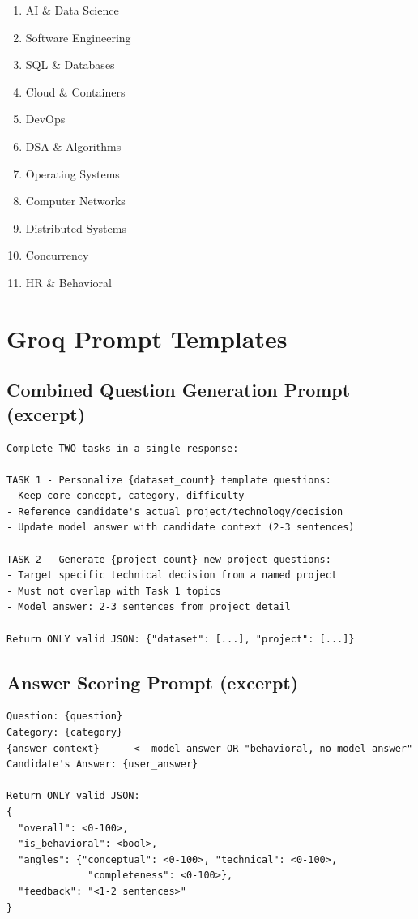 \documentclass[12pt,a4paper]{article}
\begin{document}
\begin{enumerate}[leftmargin=2em]
  \item AI \& Data Science
  \item Software Engineering
  \item SQL \& Databases
  \item Cloud \& Containers
  \item DevOps
  \item DSA \& Algorithms
  \item Operating Systems
  \item Computer Networks
  \item Distributed Systems
  \item Concurrency
  \item HR \& Behavioral
\end{enumerate}

\section{Groq Prompt Templates}

\subsection{Combined Question Generation Prompt (excerpt)}

\begin{lstlisting}[numbers=none, basicstyle=\ttfamily\footnotesize]
Complete TWO tasks in a single response:

TASK 1 - Personalize {dataset_count} template questions:
- Keep core concept, category, difficulty
- Reference candidate's actual project/technology/decision
- Update model answer with candidate context (2-3 sentences)

TASK 2 - Generate {project_count} new project questions:
- Target specific technical decision from a named project
- Must not overlap with Task 1 topics
- Model answer: 2-3 sentences from project detail

Return ONLY valid JSON: {"dataset": [...], "project": [...]}
\end{lstlisting}

\subsection{Answer Scoring Prompt (excerpt)}

\begin{lstlisting}[numbers=none, basicstyle=\ttfamily\footnotesize]
Question: {question}
Category: {category}
{answer_context}      <- model answer OR "behavioral, no model answer"
Candidate's Answer: {user_answer}

Return ONLY valid JSON:
{
  "overall": <0-100>,
  "is_behavioral": <bool>,
  "angles": {"conceptual": <0-100>, "technical": <0-100>,
              "completeness": <0-100>},
  "feedback": "<1-2 sentences>"
}
\end{lstlisting}
\end{document}
